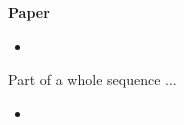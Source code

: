 \begin{frame}\begin{center}
{\LARGE\textbf{Paper}}
\end{center}\end{frame}
\begin{frame}
\begin{itemize}
\item{} \\
\end{itemize}
Part of a whole sequence ...

\begin{itemize}
\item{}
\end{itemize}

\end{frame}
